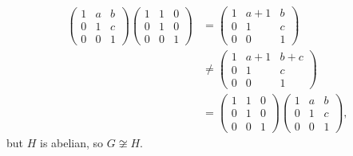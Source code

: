 \documentclass[11pt]{article}
\begin{document}
\begin{align*}
\begin{pmatrix}
	1 & a & b\\
	0 & 1 & c\\
	0 & 0 & 1
\end{pmatrix}\begin{pmatrix}
	1 & 1 & 0\\
	0 & 1 & 0\\
	0 & 0 & 1
\end{pmatrix}&=\begin{pmatrix}
	1 & a+1 & b\\
	0 & 1 & c\\
	0 & 0 & 1
\end{pmatrix}\\
	&\neq\begin{pmatrix}
	1 & a+1 & b+c\\
	0 & 1 & c\\
	0 & 0 & 1
\end{pmatrix}\\
	&=\begin{pmatrix}
	1 & 1 & 0\\
	0 & 1 & 0\\
	0 & 0 & 1
\end{pmatrix}\begin{pmatrix}
	1 & a & b\\
	0 & 1 & c\\
	0 & 0 & 1
\end{pmatrix},
\end{align*}
but $H$ is abelian, so $G\not\cong H$.
\end{document}
